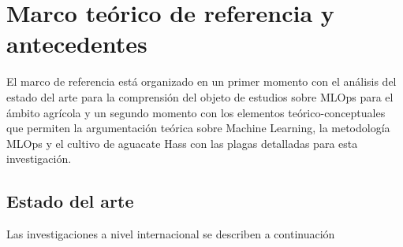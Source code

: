 \section{Marco teórico de referencia y antecedentes}

El marco de referencia está organizado en un primer momento con el análisis del estado del arte para la comprensión del objeto de estudios sobre MLOps para el ámbito agrícola y un segundo momento con los elementos teórico-conceptuales que permiten la argumentación teórica sobre Machine Learning, la metodología MLOps y el cultivo de aguacate Hass con las plagas detalladas para esta investigación.

\subsection{Estado del arte}
Las investigaciones a nivel internacional se describen a continuación


